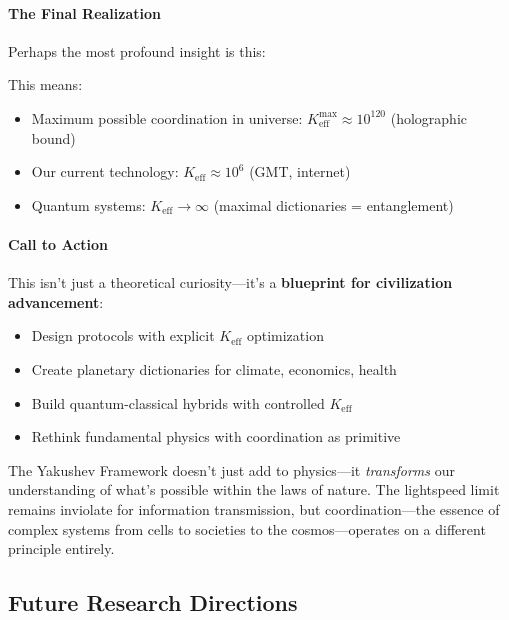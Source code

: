 \documentclass[11pt,a4paper]{article}
\begin{document}
	\paragraph{The Final Realization}
	Perhaps the most profound insight is this:
	
	\begin{center}
	\end{center}
	
	This means:
	\begin{itemize}
		\item Maximum possible coordination in universe: $K_{\mathrm{eff}}^{\max} \approx 10^{120}$ (holographic bound)
		\item Our current technology: $K_{\mathrm{eff}} \approx 10^6$ (GMT, internet)
		\item Quantum systems: $K_{\mathrm{eff}} \to \infty$ (maximal dictionaries = entanglement)
	\end{itemize}
	
	\paragraph{Call to Action}
	This isn't just a theoretical curiosity—it's a \textbf{blueprint for civilization advancement}:
	
	\begin{itemize}
		\item Design protocols with explicit $K_{\mathrm{eff}}$ optimization
		\item Create planetary dictionaries for climate, economics, health
		\item Build quantum-classical hybrids with controlled $K_{\mathrm{eff}}$
		\item Rethink fundamental physics with coordination as primitive
	\end{itemize}
	
	The Yakushev Framework doesn't just add to physics—it \emph{transforms} our understanding of what's possible within the laws of nature. The lightspeed limit remains inviolate for information transmission, but coordination—the essence of complex systems from cells to societies to the cosmos—operates on a different principle entirely.
	
	\subsection{Future Research Directions}
	
\end{document}

